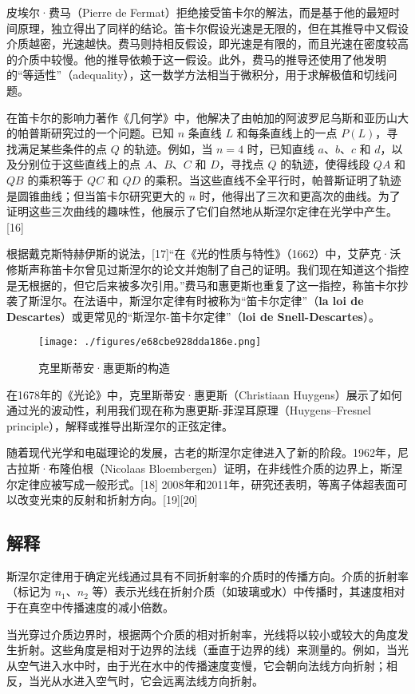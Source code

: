 皮埃尔·费马（Pierre de Fermat）拒绝接受笛卡尔的解法，而是基于他的最短时间原理，独立得出了同样的结论。笛卡尔假设光速是无限的，但在其推导中又假设介质越密，光速越快。费马则持相反假设，即光速是有限的，而且光速在密度较高的介质中较慢。他的推导依赖于这一假设。此外，费马的推导还使用了他发明的“等适性”（adequality），这一数学方法相当于微积分，用于求解极值和切线问题。

在笛卡尔的影响力著作《几何学》中，他解决了由帕加的阿波罗尼乌斯和亚历山大的帕普斯研究过的一个问题。已知 \( n \) 条直线 \( L \) 和每条直线上的一点 \( P(L) \)，寻找满足某些条件的点 \( Q \) 的轨迹。例如，当 \( n = 4 \) 时，已知直线 \( a \)、\( b \)、\( c \) 和 \( d \)，以及分别位于这些直线上的点 \( A \)、\( B \)、\( C \) 和 \( D \)，寻找点 \( Q \) 的轨迹，使得线段 \( QA \) 和 \( QB \) 的乘积等于 \( QC \) 和 \( QD \) 的乘积。当这些直线不全平行时，帕普斯证明了轨迹是圆锥曲线；但当笛卡尔研究更大的 \( n \) 时，他得出了三次和更高次的曲线。为了证明这些三次曲线的趣味性，他展示了它们自然地从斯涅尔定律在光学中产生。[16]

根据戴克斯特赫伊斯的说法，[17]“在《光的性质与特性》（1662）中，艾萨克·沃修斯声称笛卡尔曾见过斯涅尔的论文并炮制了自己的证明。我们现在知道这个指控是无根据的，但它后来被多次引用。”费马和惠更斯也重复了这一指控，称笛卡尔抄袭了斯涅尔。在法语中，斯涅尔定律有时被称为“笛卡尔定律”（\textbf{la loi de Descartes}）或更常见的“斯涅尔-笛卡尔定律”（\textbf{loi de Snell-Descartes}）。
\begin{figure}[ht]
\centering
\texttt{[image: ./figures/e68cbe928dda186e.png]}
\caption{克里斯蒂安·惠更斯的构造} \label{fig_SNR_4}
\end{figure}
在1678年的《光论》中，克里斯蒂安·惠更斯（Christiaan Huygens）展示了如何通过光的波动性，利用我们现在称为惠更斯-菲涅耳原理（Huygens–Fresnel principle），解释或推导出斯涅尔的正弦定律。

随着现代光学和电磁理论的发展，古老的斯涅尔定律进入了新的阶段。1962年，尼古拉斯·布隆伯根（Nicolaas Bloembergen）证明，在非线性介质的边界上，斯涅尔定律应被写成一般形式。[18] 2008年和2011年，研究还表明，等离子体超表面可以改变光束的反射和折射方向。[19][20]
\subsection{解释}
斯涅尔定律用于确定光线通过具有不同折射率的介质时的传播方向。介质的折射率（标记为 \(n_1\)、\(n_2\) 等）表示光线在折射介质（如玻璃或水）中传播时，其速度相对于在真空中传播速度的减小倍数。

当光穿过介质边界时，根据两个介质的相对折射率，光线将以较小或较大的角度发生折射。这些角度是相对于边界的法线（垂直于边界的线）来测量的。例如，当光从空气进入水中时，由于光在水中的传播速度变慢，它会朝向法线方向折射；相反，当光从水进入空气时，它会远离法线方向折射。

